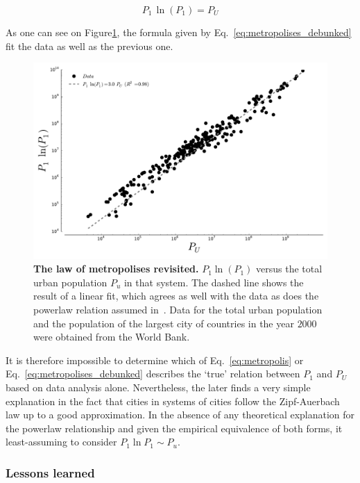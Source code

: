 \begin{equation}
    \boxed{P_1\,\ln(P_1) = P_U}
    \label{eq:metropolises_debunked}
\end{equation}

As one can see on Figure\ref{fig:metropolises_debunked}, the formula given by
Eq.~\ref{eq:metropolises_debunked} fit the data as well as the previous one.

\begin{figure}
    \centering
    \includegraphics[width=\textwidth]{gfx/chapter-intro/law_metropolises_debunked.pdf}
    \caption{{\bf The law of metropolises revisited.} $P_1 \ln(P_1)$ versus the total urban population $P_u$ in that
system. The dashed line shows the result of a linear fit, which agrees as well
with the data as does the powerlaw relation assumed in~\cite{Pumain:1997}. Data for the total urban
population and the population of the largest city of countries in the year
$2000$ were obtained from
the World Bank.\label{fig:metropolises_debunked}}
\end{figure}


It is therefore impossible to determine which of
Eq.~\ref{eq:metropolis} or Eq.~\ref{eq:metropolises_debunked} describes the
`true' relation between $P_1$ and $P_U$ based on data analysis alone.
Nevertheless, the later finds a very simple explanation in the fact that cities
in systems of cities follow the Zipf-Auerbach law up to a good
approximation. In the absence of any theoretical explanation for the powerlaw
relationship and given the empirical equivalence of both forms, it
least-assuming to consider $P_1 \ln P_1 \sim P_u$.


\subsubsection{Lessons learned}
\label{sub:lessons_learned}

